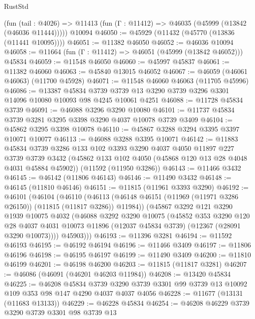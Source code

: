 \begin{lexlean}{RustStd}
\begin{coremodule}
    (fun (tail : @4026) => @11413 (fun (Γ : @11412) => @46035 (@45999 (@13842 (@46036 @11444)))))
    @10094
@46050 := @45929 (@11432 (@45770 (@13836 (@11441 @10095))))
@46051 := @11382 @46050
@46052 := @46036 @10094
@46058 := @11664 (fun (Γ : @11412) => @46051 (@45999 (@13842 @46052))) @45834
@46059 := @11548 @46050
@46060 := @45997 @45837
@46061 := @11382 @46060
@46063 := @45840 @13015 @46052
@46067 := @46059 (@46061 @46063) (@11700 @45928)
@46071 := @11548 @46060 @46063 (@11705 @45996)
@46086 := @13387
    @45834
    @3739
    @3739
    @13
    @3290
    @3739
    @3296
    @3301
    @14096
    @10080
    @10093
    @98
    @4245
    @10061
    @4251
@46088 := @11728 @45834 @3739
@46091 := @46088 @3296 @3290 @10080
@46101 := @11737 @45834 @3739 @3281 @3295 @3398 @3290 @4037 @10078 @3739 @3409
@46104 := @45862 @3295 @3398 @10078
@46110 := @45867 @3288 @3294 @3395 @3397 @10071 @10077
@46113 := @46088 @3288 @3395 @10071
@46142 := @11883
    @45834
    @3739
    @3286
    @133
    @102
    @3393
    @3290
    @4037
    @4050
    @11897
    @227
    @3739
    @3739
    @3432
    (@45862 @133 @102 @4050 (@45868 @120 @13 @28 @4048 @4031 @45884 @45902))
    (@11592 (@11950 @3286))
@46143 := @11466 @3432
@46145 := @46142 (@11806 @46143)
@46146 := @11490 @3432
@46148 := @46145 (@11810 @46146)
@46151 := @11815 (@11961 @3393 @3290)
@46192 := @46101
    (@46104
      (@46110
        (@46113 (@46148 @46151 (@11969 (@11971 @3286 @26150)) (@11815 (@11817 @3286)) @11984))
        (@45867
          @3292
          @121
          @3290
          @1939
          @10075
          @4032
          (@46088
            @3292
            @3290
            @10075
            (@45852
              @353
              @3290
              @120
              @28
              @4037
              @4031
              @10073
              @11896
              (@12037 @45834 @3739)
              (@12367 (@28091 @3290 @10073))))
          @45903)))
@46193 := @11396 @3281
@46194 := @11592 @46193
@46195 := @46192 @46194
@46196 := @11466 @3409
@46197 := @11806 @46196
@46198 := @46195 @46197
@46199 := @11490 @3409
@46200 := @11810 @46199
@46201 := @46198 @46200
@46203 := @11815 (@11817 @3281)
@46207 := @46086 (@46091 (@46201 @46203 @11984))
@46208 := @13420 @45834
@46225 := @46208
    @45834
    @3739
    @3290
    @3739
    @3301
    @99
    @3739
    @13
    @10092
    @109
    @353
    @98
    @147
    @4290
    @4037
    @4037
    @4056
@46228 := @11677 (@13131 (@11683 @13133))
@46229 := @46228 @45834
@46254 := @46208
    @46229
    @3739
    @3290
    @3739
    @3301
    @98
    @3739
    @13

\end{coremodule}
\end{lexlean}
